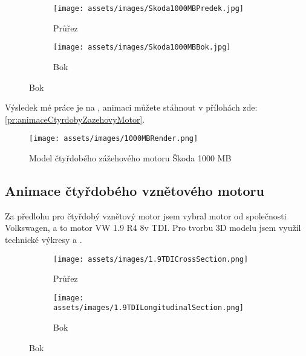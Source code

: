 \begin{figure}[H]
    \begingroup
    \makeatletter
    \renewcommand\thesubfigure{\thefigure~--~\@nameuse{subfiglabel@\alph{subfigure}}}
    \newcommand{\subfiglabel@a}{vlevo}
    \newcommand{\subfiglabel@b}{vpravo}
    \captionsetup[subfigure]{labelformat=simple, labelsep=colon}
    \renewcommand\p@subfigure{}
    \makeatother
    \centering
    \begin{subfigure}{.5\textwidth}
        \centering
        \texttt{[image: assets/images/Skoda1000MBPredek.jpg]}
        \caption{Průřez}
        \label{obr:1000MBvykresyPrurez}
    \end{subfigure}%
    \begin{subfigure}{.5\textwidth}
        \centering
        \texttt{[image: assets/images/Skoda1000MBBok.jpg]}
        \caption{Bok}
        \label{obr:1000MBvykresyBok}
    \end{subfigure}
    \endgroup
\end{figure}

{Výsledek mé práce je na , animaci můžete stáhnout v přílohách zde: \ref{pr:animaceCtyrdobyZazehovyMotor}.}

\begin{figure}[H]
    \centering
    \texttt{[image: assets/images/1000MBRender.png]}
    \caption{Model čtyřdobého zážehového motoru Škoda 1000 MB \jaObr}
    \label{obr:1000MBRender}
\end{figure}
\newpage

\subsection{Animace čtyřdobého vznětového motoru}
{Za předlohu pro čtyřdobý vznětový motor jsem vybral motor od společnosti Volkswagen, a to motor VW 1.9 R4 8v TDI. Pro tvorbu 3D modelu jsem využil technické výkresy  a .}
\cite{VWGAG:RealizingFutureTrendsInDieselEngineDevelopment}

\begin{figure}[H]
    \begingroup
    \makeatletter
    \renewcommand\thesubfigure{\thefigure~--~\@nameuse{subfiglabel@\alph{subfigure}}}
    \newcommand{\subfiglabel@a}{vlevo}
    \newcommand{\subfiglabel@b}{vpravo}
    \captionsetup[subfigure]{labelformat=simple, labelsep=colon}
    \renewcommand\p@subfigure{}
    \makeatother
    \centering
    \begin{subfigure}{.5\textwidth}
        \centering
        \texttt{[image: assets/images/1.9TDICrossSection.png]}
        \caption{Průřez}
        \label{obr:1.9TDIvykresyPrurez}
    \end{subfigure}%
    \begin{subfigure}{.5\textwidth}
        \centering
        \texttt{[image: assets/images/1.9TDILongitudinalSection.png]}
        \caption{Bok}
        \label{obr:1.9TDIvykresyBok}
    \end{subfigure}
    \endgroup
\end{figure}

